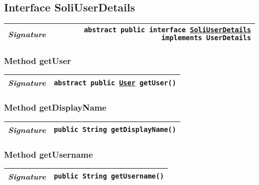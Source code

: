\begin{adjustwidth}{1.5em}{0pt}
\begin{adjustwidth}{1.5em}{0pt}
\begin{adjustwidth}{1.5em}{0pt}
{\begin{tabularx}{1.0\linewidth}{@{}l R@{}}
      \end{tabularx}}
    \end{adjustwidth}
  \end{adjustwidth}\subsection{Interface SoliUserDetails\label{edu.kit.hci.soli.config.security.SoliUserDetails} }
  \begin{adjustwidth}{1.5em}{0pt}
    {\begin{tabularx}{1.0\linewidth}{@{}l R@{}}
      \emph{Signature} & \texttt{abstract public  interface \texttt{\hyperref[edu.kit.hci.soli.config.security.SoliUserDetails]{\texttt{SoliUserDetails}} implements \texttt{UserDetails}}} \\
      \hline
  
    \end{tabularx}}\subsubsection{Method getUser\label{edu.kit.hci.soli.config.security.SoliUserDetails@getUser()}}
    \begin{adjustwidth}{1.5em}{0pt}
      {\begin{tabularx}{1.0\linewidth}{@{}l R@{}}
        \emph{Signature} & \texttt{abstract public \texttt{\hyperref[edu.kit.hci.soli.domain.User]{\texttt{User}}} getUser()} \\
        \hline
  
      \end{tabularx}}
    \end{adjustwidth}\subsubsection{Method getDisplayName\label{edu.kit.hci.soli.config.security.SoliUserDetails@getDisplayName()}}
    \begin{adjustwidth}{1.5em}{0pt}
      {\begin{tabularx}{1.0\linewidth}{@{}l R@{}}
        \emph{Signature} & \texttt{public \texttt{String} getDisplayName()} \\
        \hline
  
      \end{tabularx}}
    \end{adjustwidth}\subsubsection{Method getUsername\label{edu.kit.hci.soli.config.security.SoliUserDetails@getUsername()}}
    \begin{adjustwidth}{1.5em}{0pt}
      {\begin{tabularx}{1.0\linewidth}{@{}l R@{}}
        \emph{Signature} & \texttt{public \texttt{String} getUsername()} \\
        \hline
  

\end{tabularx}}
\end{adjustwidth}
\end{adjustwidth}
\end{adjustwidth}
